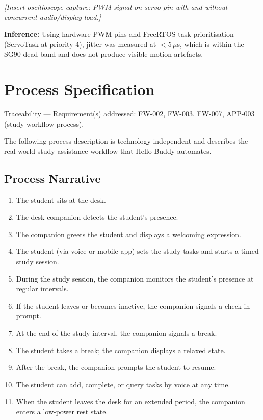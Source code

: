 \documentclass[12pt,a4paper]{article}
\begin{document}
\begin{center}
\textit{[Insert oscilloscope capture: PWM signal on servo pin with
and without concurrent audio/display load.]}
\end{center}
\label{fig:sim_servo}

\textbf{Inference:} Using hardware PWM pins and FreeRTOS task
prioritisation (ServoTask at priority 4), jitter was measured at
$<$5\,$\mu$s, which is within the SG90 dead-band and does not
produce visible motion artefacts.

\newpage
\section{Process Specification}

\begin{tracebox}
Traceability --- Requirement(s) addressed: FW-002, FW-003, FW-007,
APP-003 (study workflow process).
\end{tracebox}

\vspace{0.3cm}

The following process description is technology-independent and
describes the real-world study-assistance workflow that Hello Buddy
automates.

\subsection{Process Narrative}

\begin{enumerate}[leftmargin=*]
\item The student sits at the desk.
\item The desk companion detects the student's presence.
\item The companion greets the student and displays a welcoming
      expression.
\item The student (via voice or mobile app) sets the study tasks and
      starts a timed study session.
\item During the study session, the companion monitors the student's
      presence at regular intervals.
\item If the student leaves or becomes inactive, the companion signals
      a check-in prompt.
\item At the end of the study interval, the companion signals a break.
\item The student takes a break; the companion displays a relaxed
      state.
\item After the break, the companion prompts the student to resume.
\item The student can add, complete, or query tasks by voice at any
      time.
\item When the student leaves the desk for an extended period, the
      companion enters a low-power rest state.
\end{enumerate}
\end{document}
